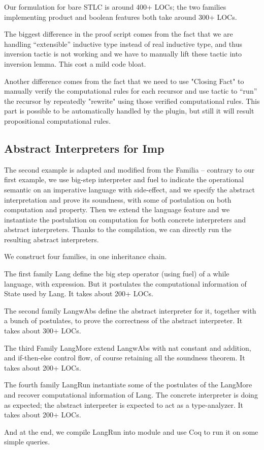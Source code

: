 Our formulation for bare STLC is around 400+ LOCs; the two families implementing product and boolean features both take around 300+ LOCs. 

The biggest difference in the proof script comes from the fact that we are handling ``extensible'' inductive type instead of real inductive type, and thus inversion tactic is not working and we have to manually lift these tactic into inversion lemma. This cost a mild code bloat. 

Another difference comes from the fact that we need to use "Closing Fact" to manually verify the computational rules for each recursor and use tactic to ``run'' the recursor by repeatedly "rewrite" using those verified computational rules. This part is possible to be automatically handled by the plugin, but still it will result propositional computational rules.  

\subsection{Abstract Interpreters for Imp}
The second example is adapted and modified from the Familia\citep{zhang2017familia}
-- contrary to our first example, we use big-step interpreter and fuel to indicate the operational semantic on an imperative language with side-effect, and we specify the abstract interpretation and prove its soundness, with some of postulation on both computation and property. Then we extend the language feature and we instantiate the postulation on computation for both concrete interpreters and abstract interpreters. Thanks to the compilation, we can directly run the resulting abstract interpreters.

We construct four families, in one inheritance chain. 


The first family Lang define the big step operator (using fuel) of a while language, with expression. But it postulates the computational information of State used by Lang. It takes about 200+ LOCs.

The second family LangwAbs define the abstract interpreter for it, together with a bunch of postulates, to prove the correctness of the abstract interpreter. It takes about 300+ LOCs. 

The third Family LangMore extend LangwAbs with nat constant and addition, and if-then-else control flow, of course retaining all the soundness theorem. It takes about 200+ LOCs.

The fourth family LangRun instantiate some of the postulates of the LangMore and recover computational information of Lang. The concrete interpreter is doing as expected; the abstract interpreter is expected to act as a type-analyzer. It takes about 200+ LOCs.


And at the end, we compile LangRun into module and use Coq to run it on some simple queries. 